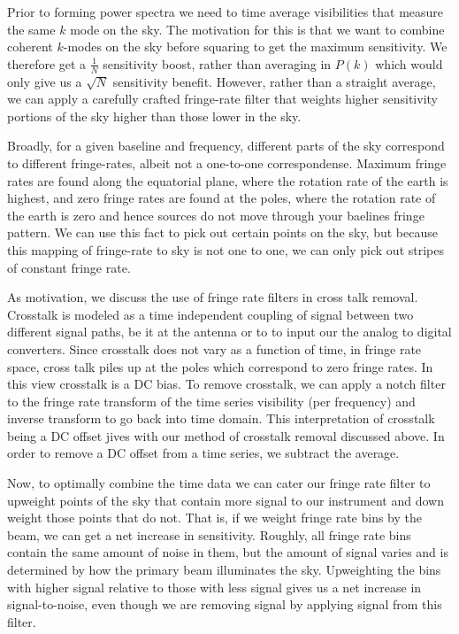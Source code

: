 \documentclass[twocolumn,numberedappendix]{emulateapj} \shorttitle{PSA64}
\begin{document}
Prior to forming power spectra we need to time average visibilities that measure
the same $k$ mode on the sky. The motivation for this is that we want to combine
coherent $k$-modes on the sky before squaring to get the maximum sensitivity. We
therefore get a $\frac{1}{N}$ sensitivity boost, rather than averaging in $P(k)$
which would only give us a $\sqrt{N}$ sensitivity benefit. However, rather than
a straight average, we can apply a carefully crafted fringe-rate filter that
weights higher sensitivity portions of the sky higher than those lower in the
sky.

Broadly, for a given baseline and frequency, different parts of the sky
correspond to different fringe-rates, albeit not a one-to-one correspondense.
Maximum fringe rates are found along the equatorial plane, where the rotation
rate of the earth is highest, and zero fringe rates are found at the poles,
where the rotation rate of the earth is zero and hence sources do not move
through your baelines fringe pattern. We can use this fact to pick out certain
points on the sky, but because this mapping of fringe-rate to sky is not one to
one, we can only pick out stripes of constant fringe rate.

As motivation, we discuss the use of fringe rate filters in cross talk removal.
Crosstalk is modeled as a time independent coupling of signal between two
different signal paths, be it at the antenna or to to input our the analog to
digital converters. Since crosstalk does not vary as a function of time, in
fringe rate space, cross talk piles up at the poles which correspond to zero
fringe rates. In this view crosstalk is a DC bias. To remove crosstalk, we can
apply a notch filter to the fringe rate transform of the time series visibility
(per frequency) and inverse transform to go back into time domain. This
interpretation of crosstalk being a DC offset jives with our method of crosstalk
removal discussed above. In order to remove a DC offset from a time series, we
subtract the average.

Now, to optimally combine the time data we can cater our fringe rate filter to
upweight points of the sky that contain more signal to our instrument and down
weight those points that do not. That is, if we weight fringe rate
bins by the beam, we can get a net increase in sensitivity. Roughly, all fringe
rate bins contain the same amount of noise in them, but the amount of signal
varies and is determined by how the primary beam illuminates the sky.
Upweighting the bins with higher signal relative to those with less signal
gives us a net increase in signal-to-noise, even though we are removing 
signal by applying signal from this filter. 
\end{document}
